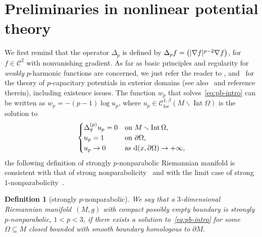 \documentclass[11pt]{article}
\numberwithin{equation}{section}
\newcommand{\dist}{\mathrm{d}}
\newcommand{\CS}{\mathscr{C}}
\DeclareMathOperator{\Int}{Int}
\let\div\relax
\DeclareMathOperator{\div}{div}
\DeclareMathOperator{\loc}{loc}
\DeclarePairedDelimiter{\sigmaAbs}{\lvert}{\rvert}
\newcommand{\abs}[1]{\ifstrempty{#1}{\sigmaAbs{\kern1pt\cdot\kern1pt}}{\mathchoice{\sigmaAbs*{#1}}{\sigmaAbs{#1}}{\sigmaAbs{#1}}{\sigmaAbs{#1}}}}
\numberwithin{equation}{section}
\newtheorem{Definition}[Theorem]{Definition}
\newcounter{case}
\newcommand{\tp}[1][p]{{\text{\tiny$(#1)$}}}
\begin{document}
\setcounter{section}{1}
\section{Preliminaries in nonlinear potential theory}
\label{sec:2}
We first remind that the operator $\Delta_p$ is defined by $\Delta_p f = \div \big(\abs{\nabla f}^{p-2}\nabla f\big)$, for $f \in \CS^2$ with nonvanishing gradient.
As far as basic principles and regularity for \emph{weakly} $p$-harmonic functions are concerned, we just refer the reader to
\cite{dibenedetto_alphalocalregularityweak_1983,evans_newprooflocal1_1982,heinonen_asuperharmonicfunctionssupersolutionsdegenerate_1988,ladyzenskaja_linearquasilinearellipticequations_1968,lewis_regularityderivativessolutionscertain_1983,lieberman_boundaryregularitysolutionsdegenerate_1988,serrin_localbehaviorsolutionsquasilinear_1964,tolksdorf_dirichletproblemquasilinearequations_1983,trudinger_harnacktypeinequalitiestheir_1967,uraltseva_degeneratequasilinearellipticsystems_1968,valtorta_laplaceoperatorriemannianmanifolds_2013}, and~\cite{holopainen_nonlinearpotentialtheoryquasiregular_1990,holopainen_volumegrowthgreenfunctions_1999} for the theory of $p$-capacitary potentials in exterior domains (see also~\cite[Chapter 1]{benatti_monotonicityformulasnonlinearpotential_2022} and reference therein), including existence issues. The function $w_p$ that solves~\eqref{eq:pb-intro} can be written as $w_p= -(p-1)\log u_p$, where $u_p \in \CS^{1,\beta}_{\loc}(M \smallsetminus \Int \Omega)$ is the solution to
\begin{equation}\label{eq:p-cap-potential}
 \begin{cases}
 \Delta^{\tp}_g u_p = 0 &\text{on $M \smallsetminus \Int \Omega$,}\\
 u_p=1 & \text{on $\partial \Omega$,}\\
 u_p\to 0 & \text{as $\dist(x,\partial \Omega)\to +\infty$,}
 \end{cases}
\end{equation}
the following definition of strongly $p$-nonparabolic Riemannian manifold is consistent with that of strong nonparabolicity~\cite{ni_meanvaluetheoremsmanifolds_2007} and with the limit case of strong $1$-nonparabolicity~\cite{benatti_isoperimetricriemannianpenroseinequality_2022}.

\begin{Definition}[strongly $p$-nonparabolic]
We say that a $3$-dimensional Riemannian manifold~$(M,g)$ with compact possibly empty boundary is \emph{strongly $p$-nonparabolic}, $1<p<3$, if there exists a solution to~\eqref{eq:pb-intro} for some $\Omega \subseteq M$ closed bounded with smooth boundary homologous to $\partial M$.
\end{Definition}
\end{document}
